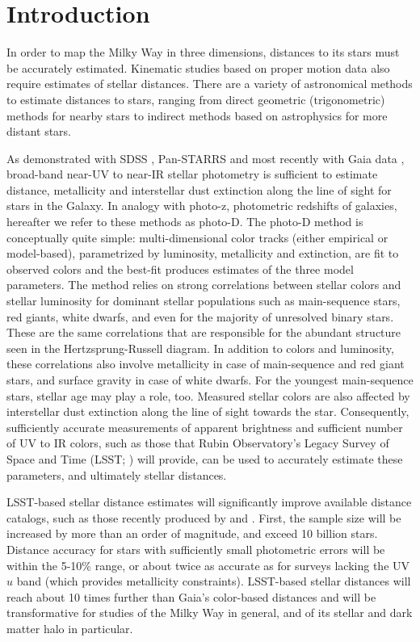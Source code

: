 \section{Introduction} \label{sec:intro}


In order to map the Milky Way in three dimensions, distances to its stars must be accurately  estimated.
Kinematic studies based on proper motion data also require estimates of stellar distances.  There are a variety
of astronomical methods to estimate distances to stars, ranging from direct geometric (trigonometric) methods
for nearby stars to indirect methods based on astrophysics for more distant stars.

As demonstrated with SDSS \citep{2008ApJ...673..864J, 2008ApJ...684..287I}, Pan-STARRS \citep{2014ApJ...783..114G, green_3d_2019} and most recently with
Gaia data \citep{bailer-jones_estimating_2021}, broad-band near-UV to near-IR stellar photometry is sufficient
to estimate distance, metallicity and interstellar dust extinction along the line of sight for stars in the Galaxy.
In analogy with photo-z, photometric redshifts of galaxies, hereafter we refer to these methods as photo-D. 
The photo-D method is conceptually quite simple: multi-dimensional color tracks (either empirical or model-based),
parametrized by luminosity, metallicity and extinction, are fit to observed colors and the best-fit produces estimates
of the three model parameters. The method relies on strong correlations between stellar colors and
stellar luminosity for dominant stellar populations such as main-sequence stars, red giants, white dwarfs, and even
for the majority of unresolved binary stars. These are the same correlations that are responsible for the abundant
structure seen in the Hertzsprung-Russell diagram. In addition to colors and luminosity, these correlations
also involve metallicity in case of main-sequence and red giant stars, and surface gravity in case of white dwarfs.
For the youngest main-sequence stars, stellar age may play a role, too. Measured stellar colors are also affected
by interstellar dust extinction along the line of sight towards the star. Consequently, sufficiently accurate measurements of apparent
brightness and sufficient number of UV to IR colors, such as those that Rubin Observatory's Legacy Survey of Space
and Time (LSST; \citealt{2019ApJ...873..111I}) will provide, can be used to accurately estimate these parameters,
and ultimately stellar distances.

LSST-based stellar distance estimates will significantly improve available distance catalogs, such as those recently produced by \cite{green_3d_2019}
and \cite{bailer-jones_estimating_2021}. First, the sample size will be increased by more than an order of magnitude, and exceed 10 billion stars.
Distance accuracy for stars with sufficiently small photometric errors will be within the 5-10\% range, or about twice
as accurate as for surveys lacking the UV $u$ band (which provides metallicity constraints). LSST-based stellar distances
will reach about 10 times further than Gaia’s color-based distances and will be transformative for studies of the
Milky Way in general, and of its stellar and dark matter halo in particular. 

